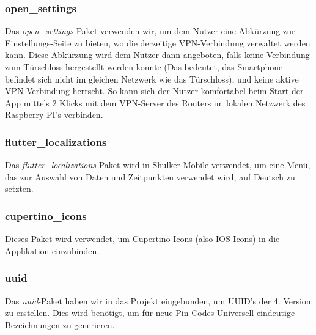 \subsubsection{open\_settings}
Das \textit{open\_settings}-Paket verwenden wir, um dem Nutzer eine Abkürzung zur Einstellungs-Seite zu bieten, 
wo die derzeitige VPN-Verbindung verwaltet werden kann. Diese Abkürzung wird dem Nutzer dann angeboten, falls 
keine Verbindung zum Türschloss hergestellt werden konnte (Das bedeutet, das Smartphone befindet sich nicht im gleichen
Netzwerk wie das Türschloss), und keine aktive VPN-Verbindung herrscht. So kann sich der Nutzer komfortabel beim Start
der App mittels 2 Klicks mit dem VPN-Server des Routers im lokalen Netzwerk des Raspberry-PI's verbinden. 

\subsubsection{flutter\_localizations}
Das \textit{flutter\_localizations}-Paket wird in Shulker-Mobile verwendet, um eine Menü, das zur Auswahl von
Daten und Zeitpunkten verwendet wird, auf Deutsch zu setzten.  

\subsubsection{cupertino\_icons}
Dieses Paket wird verwendet, um Cupertino-Icons (also IOS-Icons) in die Applikation einzubinden.

\subsubsection{uuid}
Das \textit{uuid}-Paket haben wir in das Projekt eingebunden, um UUID's der 4. Version zu erstellen.
Dies wird benötigt, um für neue Pin-Codes Universell eindeutige Bezeichnungen zu generieren.